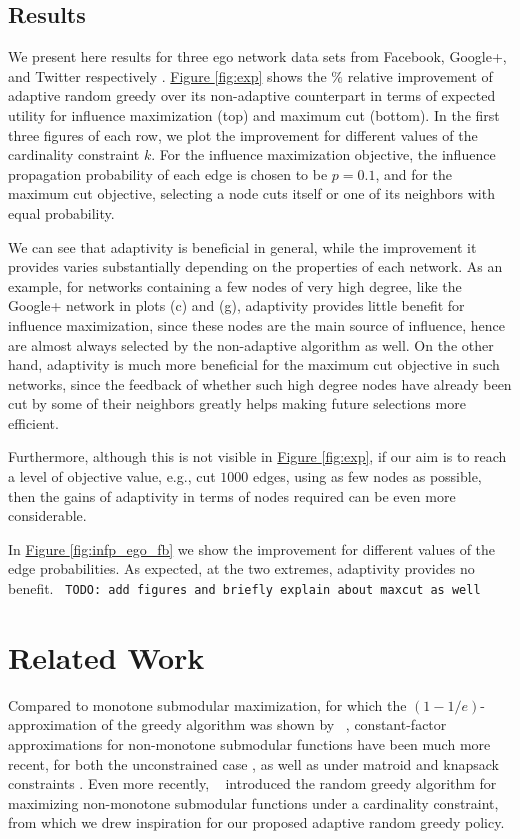 \documentclass{article}
\newcommand{\todo}[1]{\noindent\texttt{\small\color[rgb]{0.5,0.1,0.1} TODO: #1}}
\newcommand{\figref}[1]{\hyperref[#1]{Figure \ref*{#1}}}
\newcommand{\citet}[1]{\citeauthor{#1}~\shortcite{#1}}
\begin{document}
\subsection{Results}
We present here results for three ego network data sets from Facebook, Google+, and Twitter respectively \cite{mcauley12}.
\figref{fig:exp} shows the $\%$ relative improvement of adaptive random greedy over its non-adaptive counterpart in terms of expected utility for influence maximization (top) and maximum cut (bottom).
In the first three figures of each row, we plot the improvement for different values of the cardinality constraint $k$.
For the influence maximization objective, the influence propagation probability of each edge is chosen to be $p=0.1$, and for the maximum cut objective, selecting a node cuts itself or one of its neighbors with equal probability.

We can see that adaptivity is beneficial in general, while the improvement it provides varies substantially depending on the properties of each network.
As an example, for networks containing a few nodes of very high degree, like the Google+ network in plots (c) and (g), adaptivity provides little benefit for influence maximization, since these nodes are the main source of influence, hence are almost always selected by the non-adaptive algorithm as well.
On the other hand, adaptivity is much more beneficial for the maximum cut objective in such networks, since the feedback of whether such high degree nodes have already been cut by some of their neighbors greatly helps making future selections more efficient.

Furthermore, although this is not visible in \figref{fig:exp}, if our aim is to reach a level of objective value, e.g., cut $1000$ edges, using as few nodes as possible, then the gains of adaptivity in terms of nodes required can be even more considerable.

In \figref{fig:infp_ego_fb} we show the improvement for different values of the edge probabilities.
As expected, at the two extremes, adaptivity provides no benefit.
\todo{add figures and briefly explain about maxcut as well}

\section{Related Work}
Compared to monotone submodular maximization, for which the $(1-1/e)$-approximation of the greedy algorithm was shown by \citet{nemhauser78}, constant-factor approximations for non-monotone submodular functions have been much more recent, for both the unconstrained case \cite{feige07}, as well as under matroid and knapsack constraints \cite{lee09}.
Even more recently, \citet{buchbinder14} introduced the random greedy algorithm for maximizing non-monotone submodular functions under a cardinality constraint, from which we drew inspiration for our proposed adaptive random greedy policy.
\end{document}
